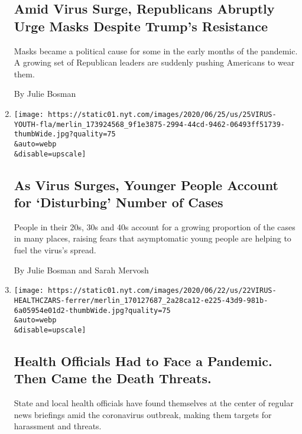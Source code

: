 \begin{enumerate}
{  \subsection{Amid Virus Surge, Republicans Abruptly Urge Masks Despite
  Trump's
  Resistance}\label{amid-virus-surge-republicans-abruptly-urge-masks-despite-trumps-resistance}}

  Masks became a political cause for some in the early months of the
  pandemic. A growing set of Republican leaders are suddenly pushing
  Americans to wear them.

  By Julie Bosman
\item
  \href{/2020/06/25/us/coronavirus-cases-young-people.html}{}

  \texttt{[image: https://static01.nyt.com/images/2020/06/25/us/25VIRUS-YOUTH-fla/merlin\_173924568\_9f1e3875-2994-44cd-9462-06493ff51739-thumbWide.jpg?quality=75\\\&auto=webp\\\&disable=upscale]}

  \hypertarget{as-virus-surges-younger-people-account-for-disturbing-number-of-cases}{%
  \subsection{As Virus Surges, Younger People Account for `Disturbing'
  Number of
  Cases}\label{as-virus-surges-younger-people-account-for-disturbing-number-of-cases}}

  People in their 20s, 30s and 40s account for a growing proportion of
  the cases in many places, raising fears that asymptomatic young people
  are helping to fuel the virus's spread.

  By Julie Bosman and Sarah Mervosh
\item
  \href{/2020/06/22/us/coronavirus-health-officials.html}{}

  \texttt{[image: https://static01.nyt.com/images/2020/06/22/us/22VIRUS-HEALTHCZARS-ferrer/merlin\_170127687\_2a28ca12-e225-43d9-981b-6a05954e01d2-thumbWide.jpg?quality=75\\\&auto=webp\\\&disable=upscale]}

  \hypertarget{health-officials-had-to-face-a-pandemic-then-came-the-death-threats}{%
  \subsection{Health Officials Had to Face a Pandemic. Then Came the
  Death
  Threats.}\label{health-officials-had-to-face-a-pandemic-then-came-the-death-threats}}

  State and local health officials have found themselves at the center
  of regular news briefings amid the coronavirus outbreak, making them
  targets for harassment and threats.


\end{enumerate}
